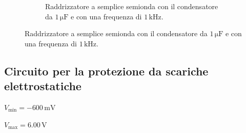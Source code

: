 \documentclass[a4paper]{article}
\begin{document}
\begin{figure}[h!]
\begin{subfigure}{1\textwidth}
						\caption{Raddrizzatore a semplice semionda con il condensatore da $ 1 \, \mathrm{\mu F} $ e con una frequenza di $ 1 \, \mathrm{kHz} $.}
					\end{subfigure}
					\label{fig:raddrizzatoreASempliceSemionda1micro}
				\end{figure}
				\newpage
		\subsection{Circuito per la protezione da scariche elettrostatiche}
			\begin{center}
				$ V_{\mathrm{min}}= -600 \, \mathrm{mV} $
			\end{center}
			\newline
			\begin{center}
				$ V_{\mathrm{max}}= 6.00 \, \mathrm{V} $
			\end{center}
\end{document}
